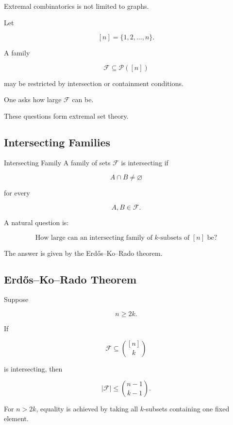 Extremal combinatorics is not limited to graphs.

Let

\[
[n]
=
\{1,2,\ldots,n\}.
\]

A family

\[
\mathcal{F}
\subseteq
\mathcal{P}([n])
\]

may be restricted by intersection or containment conditions.

One asks how large \(\mathcal{F}\) can be.

These questions form extremal set theory.

\subsection{Intersecting Families}
\label{subsec:intersecting-families}

\begin{definitionbox}{Intersecting Family}
A family of sets \(\mathcal{F}\) is intersecting if

\[
\boxed{
A\cap B\neq\varnothing
}
\]

for every

\[
A,B\in\mathcal{F}.
\]
\end{definitionbox}

A natural question is:

\[
\boxed{
\text{How large can an intersecting family of }k\text{-subsets of }
[n]\text{ be?}
}
\]

The answer is given by the Erd\H{o}s--Ko--Rado theorem.

\subsection{Erd\H{o}s--Ko--Rado Theorem}
\label{subsec:erdos-ko-rado}

\begin{theorem}
Suppose

\[
n\geq2k.
\]

If

\[
\mathcal{F}
\subseteq
\binom{[n]}{k}
\]

is intersecting, then

\[
\boxed{
|\mathcal{F}|
\leq
\binom{n-1}{k-1}.
}
\]

For \(n>2k\), equality is achieved by taking all \(k\)-subsets containing
one fixed element.
\end{theorem}

